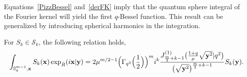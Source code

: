 \documentclass[pdftex]{sigma}
\newcommand{\mS}{\mathbb{S}}
\newcommand{\cS}{\mathcal{S}}
\numberwithin{equation}{section}
\begin{document}
Equations~\eqref{PizzBessel} and~\eqref{derFK} imply that the quantum sphere integral of the Fourier kernel will yield the f\/irst $q$-Bessel function. This result can be generalized by introducing spherical harmonics in the integration.

\begin{theorem}
\label{FHexp}
For $S_k\in\cS_k$, the following relation holds,
\begin{gather*}
\int_{\mS^{m-1}_q,\bold{x}}S_k(\bold{x})\exp_{\hat{R}}(i\bold{x}|\bold{y}) = 2\mu^{m/2-1} \Big(\Gamma_{q^2}\Big(\frac{1}{2}\Big)\Big)^{m}i^k\frac{J^{(1)}_{\frac{m}{2}+k-1}\big(\frac{1+q}{\mu}\sqrt{\bold{y}^2}|q^2\big)}
{\big(\sqrt{\bold{y}^2}\big)^{\frac{m}{2}+k-1}}S_k(\bold{y}).
\end{gather*}
\end{theorem}
\end{document}
